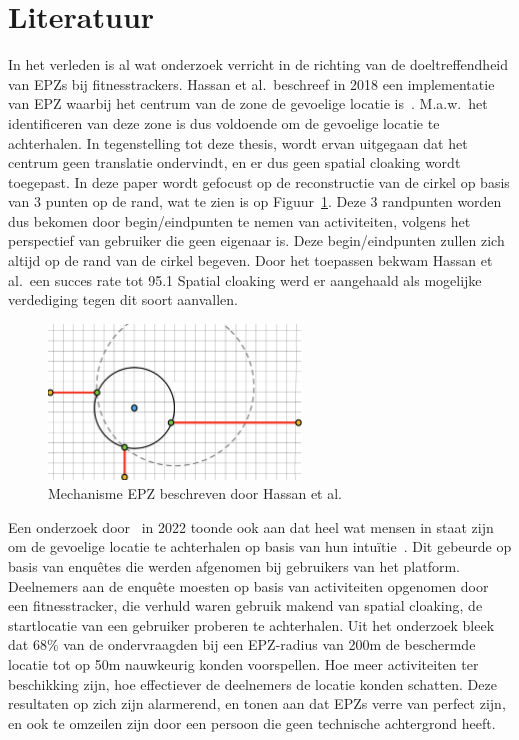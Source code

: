 \section{Literatuur}
In het verleden is al wat onderzoek verricht in de richting van de
doeltreffendheid van \acp{EPZ} bij fitnesstrackers. Hassan et al.\ beschreef in
2018 een implementatie van EPZ waarbij het centrum van de zone de gevoelige
locatie is~\cite{sec18has3:online}. M.a.w.\ het identificeren van deze zone is
dus voldoende om de gevoelige locatie te achterhalen. In tegenstelling tot deze
thesis, wordt ervan uitgegaan dat het centrum geen translatie ondervindt, en er
dus geen spatial cloaking wordt toegepast. In deze paper wordt gefocust op de
reconstructie van de cirkel op basis van 3 punten op de rand, wat te zien is op
Figuur~\ref{fig:Hassan_EPZ}. Deze 3 randpunten worden dus bekomen door
begin/eindpunten te nemen van activiteiten, volgens het perspectief van
gebruiker die geen eigenaar is. Deze begin/eindpunten zullen zich altijd op de
rand van de cirkel begeven. Door het toepassen bekwam Hassan et al.\ een succes
rate tot 95.1 Spatial cloaking werd er aangehaald als mogelijke verdediging
tegen dit soort aanvallen.
\begin{figure}[h]
    \centering
    \includegraphics[width=0.6\textwidth]{fig/EPZ-mechanisme/Hassan.png}
    \caption{Mechanisme \ac{EPZ} beschreven door Hassan et al.~\cite{sec18has3:online}}\label{fig:Hassan_EPZ}
\end{figure}

Een onderzoek door~\citeauthor{10.1145/3491102.3502136} in 2022 toonde ook aan
dat heel wat mensen in staat zijn om de gevoelige locatie te achterhalen op
basis van hun intuïtie~\cite{10.1145/3491102.3502136}. Dit gebeurde op basis
van enquêtes die werden afgenomen bij gebruikers van het platform. Deelnemers
aan de enquête moesten op basis van activiteiten opgenomen door een
fitnesstracker, die verhuld waren gebruik makend van spatial cloaking, de
startlocatie van een gebruiker proberen te achterhalen. Uit het onderzoek bleek
dat 68\% van de ondervraagden bij een \ac{EPZ}-radius van 200m de beschermde
locatie tot op 50m nauwkeurig konden voorspellen. Hoe meer activiteiten ter
beschikking zijn, hoe effectiever de deelnemers de locatie konden schatten.
Deze resultaten op zich zijn alarmerend, en tonen aan dat \acp{EPZ} verre van
perfect zijn, en ook te omzeilen zijn door een persoon die geen technische
achtergrond heeft.

